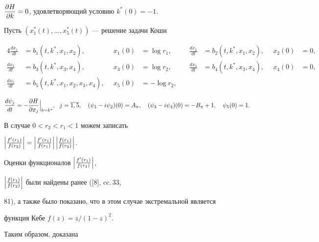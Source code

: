 $\dfrac{\partial{H}}{\partial{k}}=0$, удовлетворяющий условию $k^*(0)=-1$.


Пусть $(x^*_1(t),\dotsc,x^*_5(t))$ --- решение задачи Коши


\begin{alignat*}{4}


\frac{dx_1}{dt}&=b_1(t,k^*,x_1,x_2), &\ \;


x_1(0)&=\log r_1, &\quad


\frac{dx_2}{dt}&=b_2(t,k^*,x_1,x_2), &\ \; x_2(0)&=0, \\


%


\frac {dx_3}{dt}&=b_3(t,k^*,x_3,x_4), &\ \; x_3(0)&=\log r_2, &\quad


\frac{dx_4}{dt}&=b_4(t,k^*,x_3,x_4), &\ \; x_4(0)&=0, \\


%


\frac{dx_5}{dt}&=b_5(t,k^*,x_1,x_2,x_3,x_4), &\ \;


x_5(0) &=-\log r_2, &\ \; &\ \; & \ \; &\ \;


\end{alignat*}


$$


\frac{d\psi_j}{dt}=-\pde{H}{x_j}\Big|_{k=k^*},\ \; j=\overline{1, 5},\quad


(\psi_1-i\psi_2)(0)=A_{\pi},\quad (\psi_3-i\psi_4)(0)=-B_{\pi} + 1,\quad


\psi_5(0)=1.


$$





В случае $0 < r_2 < r_1 < 1$ можем записать


$\Bigl|\frac{f'(r_1)}{f(r_2)}\Bigr|


=\Bigl|\frac{f'(r_1)}{f(r_1)}\Bigr|\,\Bigl|\frac{f(r_1)}{f(r_2)}\Bigr|$.


Оценки функционалов $\Bigl|\frac{f'(r_1)}{f(r_1)}\Bigr|$,


$\Bigl|\frac{f(r_1)}{f(r_2)}\Bigr|$ были найдены ранее ([8], cc.\,33,


81), а также было показано, что в этом случае экстремальной является


функция Кебе $f(z)=z/(1-z)^2$.





Таким образом, доказана





